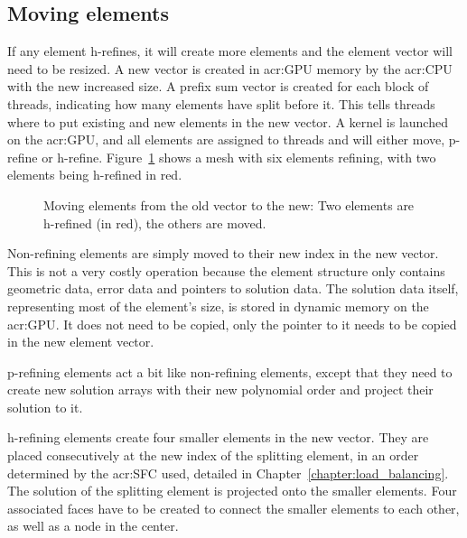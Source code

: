 \subsection{Moving elements}\label{subsection:adaptive_mesh_refinement:implementation:moving_elements}

If any element h-refines, it will create more elements and the element vector will need to be
resized. A new vector is created in \acrshort{acr:GPU} memory by the \acrshort{acr:CPU} with the new
increased size. A prefix sum vector is created for each block of threads, indicating how many
elements have split before it. This tells threads where to put existing and new elements in the new
vector. A kernel is launched on the \acrshort{acr:GPU}, and all elements are assigned to threads and
will either move, p-refine or h-refine. Figure~\ref{fig:refinement_offset} shows a mesh with six
elements refining, with two elements being h-refined in red.

\begin{figure}[H]
    \centering
    
    \caption{Moving elements from the old vector to the new: Two elements are h-refined (in red), the others are moved.}\label{fig:refinement_offset}
\end{figure}

Non-refining elements are simply moved to their new index in the new vector. This is not a very
costly operation because the element structure only contains geometric data, error data and pointers
to solution data. The solution data itself, representing most of the element's size, is stored in
dynamic memory on the \acrshort{acr:GPU}. It does not need to be copied, only the pointer to it
needs to be copied in the new element vector.

\noindent
p-refining elements act a bit like non-refining elements, except that they need to create new
solution arrays with their new polynomial order and project their solution to it.

\noindent
h-refining elements create four smaller elements in the new vector. They are placed consecutively at
the new index of the splitting element, in an order determined by the \acrfull{acr:SFC} used,
detailed in Chapter~\ref{chapter:load_balancing}. The solution of the splitting element is projected
onto the smaller elements. Four associated faces have to be created to connect the smaller elements
to each other, as well as a node in the center.

